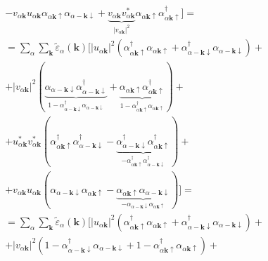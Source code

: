 \documentclass[class=article, crop=false]{standalone}
\begin{document}
\begin{equation}
\begin{split}
		& - v_{ \alpha \mathbf{k}} u_{ \alpha \mathbf{k}} \alpha_{ \alpha \mathbf{k} \uparrow} \alpha_{ \alpha - \mathbf{k} \downarrow} + 
		\underbrace{v_{ \alpha \mathbf{k}} v_{ \alpha \mathbf{k}}^{ \ast}}_{ \left| v_{ \alpha \mathbf{k}} \right|^{2}} \alpha_{ \alpha \mathbf{k} \uparrow} \alpha_{ \alpha \mathbf{k} \uparrow}^{ \dagger} ] = \\
		& = \sum_{ \alpha} \sum_{ \mathbf{k}} \tilde{ \varepsilon}_{ \alpha} ( \mathbf{k}) 
		[ \left| u_{ \alpha \mathbf{k}} \right|^{2} \left( \alpha_{ \alpha \mathbf{k} \uparrow}^{ \dagger} \alpha_{ \alpha \mathbf{k} \uparrow} + \alpha_{ \alpha - \mathbf{k} \downarrow}^{ \dagger} \alpha_{ \alpha - \mathbf{k} \downarrow} \right) + \\
		& + \left| v_{ \alpha \mathbf{k}} \right|^{2} ( \underbrace{\alpha_{ \alpha - \mathbf{k} \downarrow} \alpha_{ \alpha - \mathbf{k} \downarrow}^{ \dagger}}_{1 - \alpha_{ \alpha - \mathbf{k} \downarrow}^{ \dagger} \alpha_{ \alpha - \mathbf{k} \downarrow}} + \underbrace{ \alpha_{ \alpha \mathbf{k} \uparrow} \alpha_{ \alpha \mathbf{k} \uparrow}^{ \dagger}}_{1 - \alpha_{ \alpha \mathbf{k} \uparrow}^{ \dagger} \alpha_{ \alpha \mathbf{k} \uparrow}} ) + \\
		& +	u_{ \alpha \mathbf{k}}^{ \ast} v_{ \alpha \mathbf{k}}^{ \ast} ( \alpha_{ \alpha \mathbf{k} \uparrow}^{ \dagger} \alpha_{ \alpha - \mathbf{k} \downarrow}^{ \dagger} - \underbrace{\alpha_{ \alpha - \mathbf{k} \downarrow}^{ \dagger} \alpha_{ \alpha \mathbf{k} \uparrow}^{ \dagger}}_{- \alpha_{ \alpha \mathbf{k} \uparrow}^{ \dagger} \alpha_{ \alpha - \mathbf{k} \downarrow}^{ \dagger}} ) + \\
		& + v_{ \alpha \mathbf{k}} u_{ \alpha \mathbf{k}} ( \alpha_{ \alpha - \mathbf{k} \downarrow} \alpha_{ \alpha \mathbf{k} \uparrow} - \underbrace{\alpha_{ \alpha \mathbf{k} \uparrow} \alpha_{ \alpha - \mathbf{k} \downarrow}}_{- \alpha_{ \alpha - \mathbf{k} \downarrow} \alpha_{ \alpha \mathbf{k} \uparrow}} ) ] = \\
		& = \sum_{ \alpha} \sum_{ \mathbf{k}} \tilde{ \varepsilon}_{ \alpha} ( \mathbf{k}) 
		[ \left| u_{ \alpha \mathbf{k}} \right|^{2} \left( \alpha_{ \alpha \mathbf{k} \uparrow}^{ \dagger} \alpha_{ \alpha \mathbf{k} \uparrow} + \alpha_{ \alpha - \mathbf{k} \downarrow}^{ \dagger} \alpha_{ \alpha - \mathbf{k} \downarrow} \right) + \\
		& + \left| v_{ \alpha \mathbf{k}} \right|^{2} ( 1 - \alpha_{ \alpha - \mathbf{k} \downarrow}^{ \dagger} \alpha_{ \alpha - \mathbf{k} \downarrow} + 1 - \alpha_{ \alpha \mathbf{k} \uparrow}^{ \dagger} \alpha_{ \alpha \mathbf{k} \uparrow} ) + \\

\end{split}
\end{equation}
\end{document}
